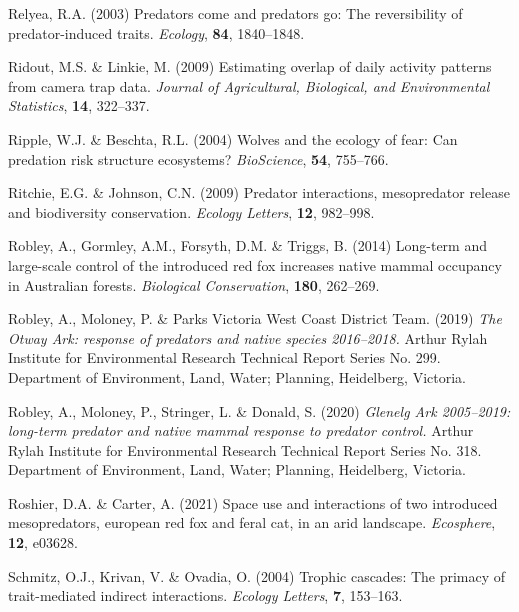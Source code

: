 \documentclass[]{elsarticle} %
\begin{document}
\leavevmode\hypertarget{ref-relyea2003predators}{}%
Relyea, R.A. (2003) Predators come and predators go: The reversibility of predator-induced traits. \emph{Ecology}, \textbf{84}, 1840--1848.

\leavevmode\hypertarget{ref-ridout2009estimating}{}%
Ridout, M.S. \& Linkie, M. (2009) Estimating overlap of daily activity patterns from camera trap data. \emph{Journal of Agricultural, Biological, and Environmental Statistics}, \textbf{14}, 322--337.

\leavevmode\hypertarget{ref-ripple2004wolves}{}%
Ripple, W.J. \& Beschta, R.L. (2004) Wolves and the ecology of fear: Can predation risk structure ecosystems? \emph{BioScience}, \textbf{54}, 755--766.

\leavevmode\hypertarget{ref-ritchie2009predator}{}%
Ritchie, E.G. \& Johnson, C.N. (2009) Predator interactions, mesopredator release and biodiversity conservation. \emph{Ecology Letters}, \textbf{12}, 982--998.

\leavevmode\hypertarget{ref-robley2014long}{}%
Robley, A., Gormley, A.M., Forsyth, D.M. \& Triggs, B. (2014) Long-term and large-scale control of the introduced red fox increases native mammal occupancy in Australian forests. \emph{Biological Conservation}, \textbf{180}, 262--269.

\leavevmode\hypertarget{ref-robley2019otway}{}%
Robley, A., Moloney, P. \& Parks Victoria West Coast District Team. (2019) \emph{The Otway Ark: response of predators and native species 2016--2018.} Arthur Rylah Institute for Environmental Research Technical Report Series No. 299. Department of Environment, Land, Water; Planning, Heidelberg, Victoria.

\leavevmode\hypertarget{ref-robley2020glenelg}{}%
Robley, A., Moloney, P., Stringer, L. \& Donald, S. (2020) \emph{Glenelg Ark 2005--2019: long-term predator and native mammal response to predator control.} Arthur Rylah Institute for Environmental Research Technical Report Series No. 318. Department of Environment, Land, Water; Planning, Heidelberg, Victoria.

\leavevmode\hypertarget{ref-roshier2021space}{}%
Roshier, D.A. \& Carter, A. (2021) Space use and interactions of two introduced mesopredators, european red fox and feral cat, in an arid landscape. \emph{Ecosphere}, \textbf{12}, e03628.

\leavevmode\hypertarget{ref-schmitz2004trophic}{}%
Schmitz, O.J., Krivan, V. \& Ovadia, O. (2004) Trophic cascades: The primacy of trait-mediated indirect interactions. \emph{Ecology Letters}, \textbf{7}, 153--163.
\end{document}
